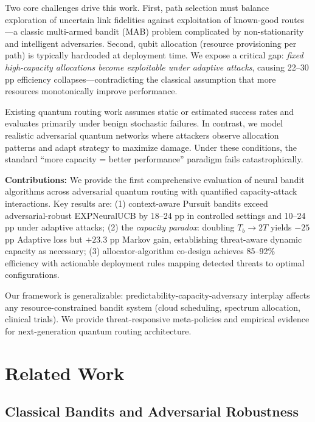 \documentclass[10pt,twocolumn,journal]{IEEEtran}
\begin{document}
Two core challenges drive this work. First, path selection must balance exploration of uncertain link fidelities against exploitation of known-good routes—a classic multi-armed bandit (MAB) problem complicated by non-stationarity and intelligent adversaries. Second, qubit allocation (resource provisioning per path) is typically hardcoded at deployment time. We expose a critical gap: \textit{fixed high-capacity allocations become exploitable under adaptive attacks}, causing 22--30 pp efficiency collapses—contradicting the classical assumption that more resources monotonically improve performance.

Existing quantum routing work assumes static or estimated success rates and evaluates primarily under benign stochastic failures. In contrast, we model realistic adversarial quantum networks where attackers observe allocation patterns and adapt strategy to maximize damage. Under these conditions, the standard ``more capacity = better performance'' paradigm fails catastrophically.

\textbf{Contributions:} We provide the first comprehensive evaluation of neural bandit algorithms across adversarial quantum routing with quantified capacity-attack interactions. Key results are: (1) context-aware Pursuit bandits exceed adversarial-robust EXPNeuralUCB by 18--24 pp in controlled settings and 10--24 pp under adaptive attacks; (2) the \textit{capacity paradox}: doubling $T_b \to 2T$ yields $-25$ pp Adaptive loss but $+23.3$ pp Markov gain, establishing threat-aware dynamic capacity as necessary; (3) allocator-algorithm co-design achieves 85--92\% efficiency with actionable deployment rules mapping detected threats to optimal configurations.

Our framework is generalizable: predictability-capacity-adversary interplay affects any resource-constrained bandit system (cloud scheduling, spectrum allocation, clinical trials). We provide threat-responsive meta-policies and empirical evidence for next-generation quantum routing architecture.

\section{Related Work}
\label{sec:related}

\subsection{Classical Bandits and Adversarial Robustness}
\end{document}
